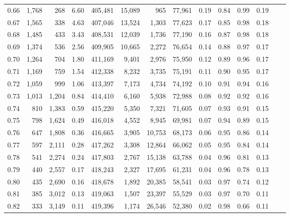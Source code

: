 \begin{tabular}{rrrrrrrrrrrrrr}
0.66 &  1,768 &    268 &     6.60 &  405,481 &   15,089 &     965 &  77,961 &  0.19 &  0.84 &  0.99 &      0.19 \\
0.67 &  1,565 &    338 &     4.63 &  407,046 &   13,524 &   1,303 &  77,623 &  0.17 &  0.85 &  0.98 &      0.18 \\
0.68 &  1,485 &    433 &     3.43 &  408,531 &   12,039 &   1,736 &  77,190 &  0.16 &  0.87 &  0.98 &      0.18 \\
0.69 &  1,374 &    536 &     2.56 &  409,905 &   10,665 &   2,272 &  76,654 &  0.14 &  0.88 &  0.97 &      0.17 \\
0.70 &  1,264 &    704 &     1.80 &  411,169 &    9,401 &   2,976 &  75,950 &  0.12 &  0.89 &  0.96 &      0.17 \\
0.71 &  1,169 &    759 &     1.54 &  412,338 &    8,232 &   3,735 &  75,191 &  0.11 &  0.90 &  0.95 &      0.17 \\
0.72 &  1,059 &    999 &     1.06 &  413,397 &    7,173 &   4,734 &  74,192 &  0.10 &  0.91 &  0.94 &      0.16 \\
0.73 &  1,013 &  1,204 &     0.84 &  414,410 &    6,160 &   5,938 &  72,988 &  0.08 &  0.92 &  0.92 &      0.16 \\
0.74 &    810 &  1,383 &     0.59 &  415,220 &    5,350 &   7,321 &  71,605 &  0.07 &  0.93 &  0.91 &      0.15 \\
0.75 &    798 &  1,624 &     0.49 &  416,018 &    4,552 &   8,945 &  69,981 &  0.07 &  0.94 &  0.89 &      0.15 \\
0.76 &    647 &  1,808 &     0.36 &  416,665 &    3,905 &  10,753 &  68,173 &  0.06 &  0.95 &  0.86 &      0.14 \\
0.77 &    597 &  2,111 &     0.28 &  417,262 &    3,308 &  12,864 &  66,062 &  0.05 &  0.95 &  0.84 &      0.14 \\
0.78 &    541 &  2,274 &     0.24 &  417,803 &    2,767 &  15,138 &  63,788 &  0.04 &  0.96 &  0.81 &      0.13 \\
0.79 &    440 &  2,557 &     0.17 &  418,243 &    2,327 &  17,695 &  61,231 &  0.04 &  0.96 &  0.78 &      0.13 \\
0.80 &    435 &  2,690 &     0.16 &  418,678 &    1,892 &  20,385 &  58,541 &  0.03 &  0.97 &  0.74 &      0.12 \\
0.81 &    385 &  3,012 &     0.13 &  419,063 &    1,507 &  23,397 &  55,529 &  0.03 &  0.97 &  0.70 &      0.11 \\
0.82 &    333 &  3,149 &     0.11 &  419,396 &    1,174 &  26,546 &  52,380 &  0.02 &  0.98 &  0.66 &      0.11 \\

\end{tabular}
